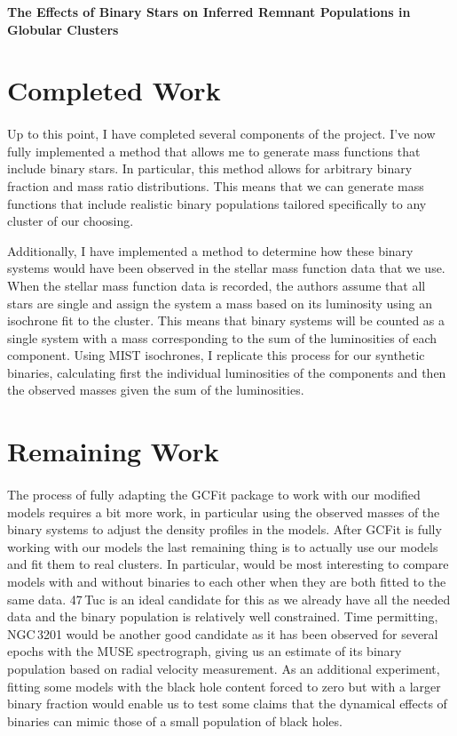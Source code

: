 \documentclass[12pt,letterpaper]{article}
\begin{document}
\begin{center}
	\Large{\textbf{The Effects of Binary Stars on Inferred Remnant Populations in Globular
			Clusters}}
\end{center}



\section{Completed Work}
\paragraph{}
Up to this point, I have completed several components of the project. I've now fully implemented a
method that allows me to generate mass functions that include binary stars. In particular, this
method allows for arbitrary binary fraction and mass ratio distributions. This means that we can
generate mass functions that include realistic binary populations tailored specifically to any
cluster of our choosing.

Additionally, I have implemented a method to determine how these binary systems would have been
observed in the stellar mass function data that we use. When the stellar mass function data is
recorded, the authors assume that all stars are single and assign the system a mass based on its
luminosity using an isochrone fit to the cluster. This means that binary systems will be counted as
a single system with a mass corresponding to the sum of the luminosities of each component. Using
MIST isochrones, I replicate this process for our synthetic binaries, calculating first the
individual luminosities of the components and then the observed masses given the sum of the
luminosities.


\section{Remaining Work}
\paragraph{}

The process of fully adapting the GCFit package to work with our modified models requires a bit more
work, in particular using the observed masses of the binary systems to adjust the density profiles
in the models. After GCFit is fully working with our models the last remaining thing is to actually
use our models and fit them to real clusters. In particular, would be most interesting to compare
models with and without binaries to each other when they are both fitted to the same data. 47\,Tuc
is an ideal candidate for this as we already have all the needed data and the binary population is
relatively well constrained. Time permitting, NGC\,3201 would be another good candidate as it has
been observed for several epochs with the MUSE spectrograph, giving us an estimate of its binary
population based on radial velocity measurement. As an additional experiment, fitting some models
with the black hole content forced to zero but with a larger binary fraction would enable us to test
some claims that the dynamical effects of binaries can mimic those of a small population of black
holes.
\end{document}
